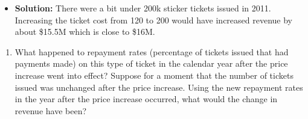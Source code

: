 \documentclass[
  letterpaper,
  DIV=11,
  numbers=noendperiod]{scrartcl}
\providecommand{\tightlist}{%
  \setlength{\itemsep}{0pt}\setlength{\parskip}{0pt}}\usepackage{longtable,booktabs,array}
\begin{document}
\begin{itemize}
\tightlist
\item
  \textbf{Solution:} There were a bit under 200k sticker tickets issued
  in 2011. Increasing the ticket cost from 120 to 200 would have
  increased revenue by about \$15.5M which is close to \$16M.
\end{itemize}

\begin{enumerate}
\def\labelenumi{\arabic{enumi}.}
\setcounter{enumi}{3}
\tightlist
\item
  What happened to repayment rates (percentage of tickets issued that
  had payments made) on this type of ticket in the calendar year after
  the price increase went into effect? Suppose for a moment that the
  number of tickets issued was unchanged after the price increase. Using
  the new repayment rates in the year after the price increase occurred,
  what would the change in revenue have been?
\end{enumerate}
\end{document}
